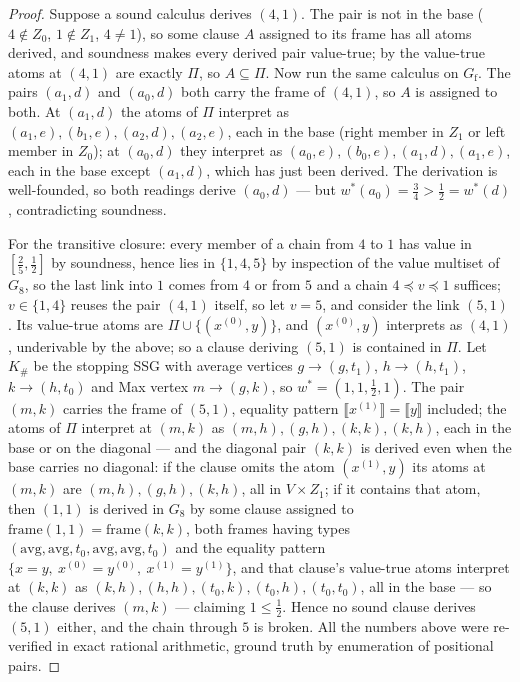 \documentclass[11pt]{article}
\theoremstyle{plain}
\theoremstyle{definition}
\begin{document}
\begin{proof}
Suppose a sound calculus derives $(4,1)$. The pair is not in the base
($4\notin Z_0$, $1\notin Z_1$, $4\ne1$), so some clause $A$ assigned to
its frame has all atoms derived, and soundness makes every derived pair
value-true; by  the value-true atoms at $(4,1)$
are exactly $\Pi$, so $A\subseteq\Pi$. Now run the same calculus on
$G_{\mathrm{f}}$. The pairs $(a_1,d)$ and $(a_0,d)$ both carry the frame of
$(4,1)$, so $A$ is assigned to both. At $(a_1,d)$ the atoms of $\Pi$
interpret as $(a_1,e),(b_1,e),(a_2,d),(a_2,e)$, each in the base (right
member in $Z_1$ or left member in $Z_0$); at $(a_0,d)$ they interpret as
$(a_0,e),(b_0,e),(a_1,d),(a_1,e)$, each in the base except $(a_1,d)$,
which has just been derived. The derivation is well-founded, so both
readings derive $(a_0,d)$ --- but
$w^\ast(a_0)=\tfrac34>\tfrac12=w^\ast(d)$, contradicting soundness.

For the transitive closure: every member of a chain from $4$ to $1$ has
value in $[\tfrac25,\tfrac12]$ by soundness, hence lies in $\{1,4,5\}$ by
inspection of the value multiset of $G_8$, so the last link into $1$ comes
from $4$ or from $5$ and a chain $4\preceq v\preceq1$ suffices; $v\in\{1,4\}$ reuses the pair
$(4,1)$ itself, so let $v=5$, and consider the link $(5,1)$. Its
value-true atoms are $\Pi\cup\{(x^{(0)},y)\}$, and $(x^{(0)},y)$
interprets as $(4,1)$, underivable by the above; so a clause deriving
$(5,1)$ is contained in $\Pi$. Let $K_{\#}$ be the stopping SSG with
average vertices $g\to(g,t_1)$, $h\to(h,t_1)$, $k\to(h,t_0)$ and Max
vertex $m\to(g,k)$, so $w^\ast=(1,1,\tfrac12,1)$. The pair $(m,k)$
carries the frame of $(5,1)$, equality pattern
$\llbracket x^{(1)}\rrbracket=\llbracket y\rrbracket$ included; the atoms
of $\Pi$ interpret at $(m,k)$ as $(m,h),(g,h),(k,k),(k,h)$, each in the
base or on the diagonal --- and the diagonal pair $(k,k)$ is derived even
when the base carries no diagonal: if the clause omits the atom
$(x^{(1)},y)$ its atoms at $(m,k)$ are $(m,h),(g,h),(k,h)$, all in
$V\times Z_1$; if it contains that atom, then $(1,1)$ is derived in $G_8$
by some clause assigned to $\mathrm{frame}(1,1)=\mathrm{frame}(k,k)$, both
frames having types $(\mathrm{avg},\mathrm{avg},t_0,\mathrm{avg},\mathrm{avg},t_0)$
and the equality pattern $\{x=y,\ x^{(0)}=y^{(0)},\ x^{(1)}=y^{(1)}\}$,
and that clause's value-true atoms interpret at $(k,k)$ as
$(k,h),(h,h),(t_0,k),(t_0,h),(t_0,t_0)$, all in the base --- so the clause
derives $(m,k)$ --- claiming
$1\le\tfrac12$. Hence no sound clause derives $(5,1)$ either, and the
chain through $5$ is broken. All the numbers above were re-verified in
exact rational arithmetic, ground truth by enumeration of positional
pairs.
\end{proof}
\end{document}
